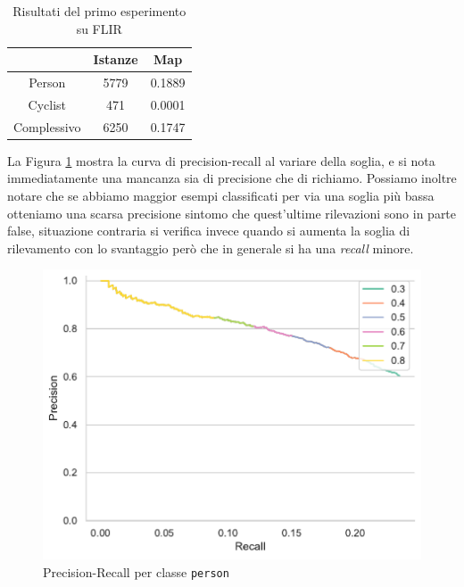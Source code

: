 \begin{table}[]
    \centering
    \begin{tabular}{c|c|c|}
    \cline{2-3}
     & Istanze & Map \\ \hline
    \multicolumn{1}{|c|}{Person} & 5779 & 0.1889 \\ \hline
    \multicolumn{1}{|c|}{Cyclist} & 471 & 0.0001 \\ \hline
    \multicolumn{1}{|c|}{Complessivo} & 6250 & 0.1747 \\ \hline
    \end{tabular}
    \caption{Risultati del primo esperimento su FLIR}
    \label{tab:first_experiment_flir}
\end{table}
La Figura \ref{fig:precision_recall_person_1} mostra la curva di precision-recall al variare della soglia, e si nota immediatamente una mancanza sia di precisione che di richiamo. Possiamo inoltre notare che se abbiamo maggior esempi classificati per via una soglia più bassa otteniamo una scarsa precisione sintomo che quest'ultime rilevazioni sono in parte false, situazione contraria si verifica invece quando si aumenta la soglia di rilevamento con lo svantaggio però che in generale si ha una \textit{recall} minore.  
\begin{figure}[]
    \centering
    \includegraphics[width=\textwidth]{images/graphic/precision_recall_test_flir_kaist.pdf}
    \caption{Precision-Recall per classe \texttt{person}}
    \label{fig:precision_recall_person_1}
\end{figure}





